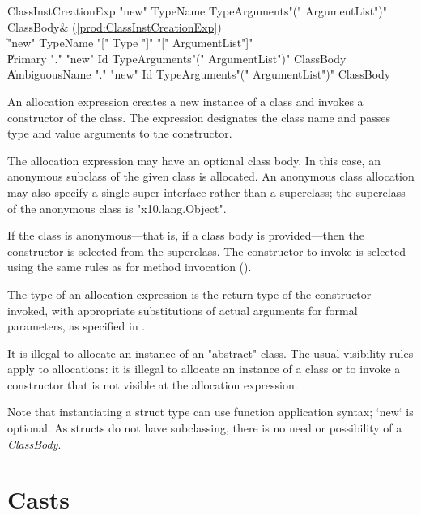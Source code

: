 \begin{bbgrammar}
ClassInstCreationExp \: \xcd"new" TypeName TypeArguments\opt \xcd"(" ArgumentList\opt \xcd")" ClassBody\opt & (\ref{prod:ClassInstCreationExp}) \\
                    \| \xcd"new" TypeName \xcd"[" Type \xcd"]" \xcd"[" ArgumentList\opt \xcd"]" \\
                    \| Primary \xcd"." \xcd"new" Id TypeArguments\opt \xcd"(" ArgumentList\opt \xcd")" ClassBody\opt \\
                    \| AmbiguousName \xcd"." \xcd"new" Id TypeArguments\opt \xcd"(" ArgumentList\opt \xcd")" ClassBody\opt \\
\end{bbgrammar}

An allocation expression creates a new instance of a class and
invokes a constructor of the class.
The expression designates the class name and passes
type and value arguments to the constructor.

The allocation expression may have an optional class body.
In this case, an anonymous subclass of the given class is
allocated.   An anonymous class allocation may also specify a
single super-interface rather than a superclass; the superclass
of the anonymous class is \xcd"x10.lang.Object".

If the class is anonymous---that is, if a class body is
provided---then the constructor is selected from the superclass.
The constructor to invoke is selected using the same rules as
for method invocation ().

The type of an allocation expression
is the return type of the constructor invoked, with appropriate
substitutions  of actual arguments for formal parameters, as
specified in .

It is illegal to allocate an instance of an \xcd"abstract" class.
The usual visibility rules apply to allocations: 
it is illegal to allocate an instance of a class or to invoke a
constructor that is not visible at
the allocation expression.

Note that instantiating a struct type can use function application syntax; 
\xcd`new` is optional.  As structs do not have subclassing, there is no need or
possibility of a {\em ClassBody}.


\section{Casts}\label{ClassCast}


